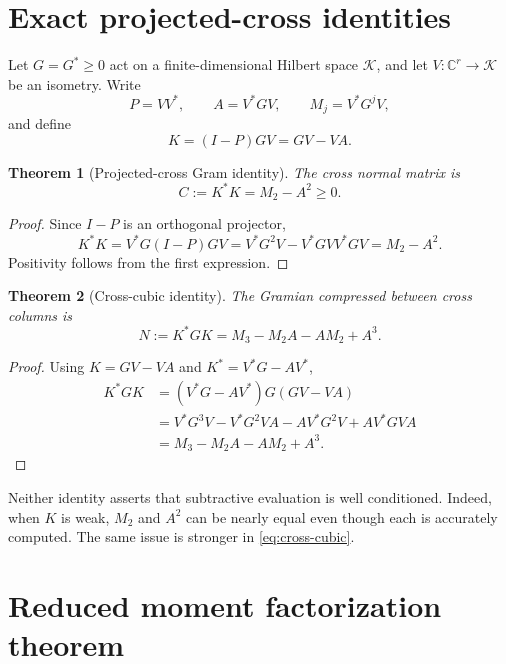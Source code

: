 \documentclass[11pt]{article}
\newtheorem{theorem}{Theorem}[section]
\theoremstyle{definition}
\theoremstyle{remark}
\begin{document}
\section{Exact projected-cross identities}
\label{sec:identities}

Let $G=G^*\ge0$ act on a finite-dimensional Hilbert space $\mathcal K$, and
let $V:\mathbb C^r\to\mathcal K$ be an isometry.  Write
\[
 P=VV^*,\qquad A=V^*GV,\qquad M_j=V^*G^jV,
\]
and define
\begin{equation}
 K=(I-P)GV=GV-VA.
 \label{eq:cross}
\end{equation}

\begin{theorem}[Projected-cross Gram identity]
\label{thm:cross-gram}
The cross normal matrix is
\begin{equation}
 C:=K^*K=M_2-A^2\ge0.
 \label{eq:cross-gram}
\end{equation}
\end{theorem}

\begin{proof}
Since $I-P$ is an orthogonal projector,
\[
 K^*K=V^*G(I-P)GV
 =V^*G^2V-V^*GVV^*GV=M_2-A^2.
\]
Positivity follows from the first expression.
\end{proof}

\begin{theorem}[Cross-cubic identity]
\label{thm:cross-cubic}
The Gramian compressed between cross columns is
\begin{equation}
 N:=K^*GK=M_3-M_2A-AM_2+A^3.
 \label{eq:cross-cubic}
\end{equation}
\end{theorem}

\begin{proof}
Using $K=GV-VA$ and $K^*=V^*G-AV^*$,
\begin{align*}
 K^*GK
 &=(V^*G-AV^*)G(GV-VA)\\
 &=V^*G^3V-V^*G^2VA-AV^*G^2V+AV^*GVA\\
 &=M_3-M_2A-AM_2+A^3.
\end{align*}
\end{proof}

Neither identity asserts that subtractive evaluation is well conditioned.
Indeed, when $K$ is weak, $M_2$ and $A^2$ can be nearly equal even though
each is accurately computed.  The same issue is stronger in
\eqref{eq:cross-cubic}.

\section{Reduced moment factorization theorem}
\label{sec:factorization}
\end{document}
